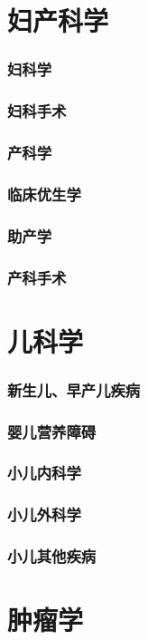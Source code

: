 \documentclass[UTF8]{../ApplicationUniverse}
\begin{document}
\section{妇产科学}
    \subsubsection{妇科学}
    \subsubsection{妇科手术}
    \subsubsection{产科学}
    \subsubsection{临床优生学}
    \subsubsection{助产学}
    \subsubsection{产科手术}
\section{儿科学}
    \subsubsection{新生儿、早产儿疾病}
    \subsubsection{婴儿营养障碍}
    \subsubsection{小儿内科学}
    \subsubsection{小儿外科学}
    \subsubsection{小儿其他疾病}
\section{肿瘤学}
\end{document}
